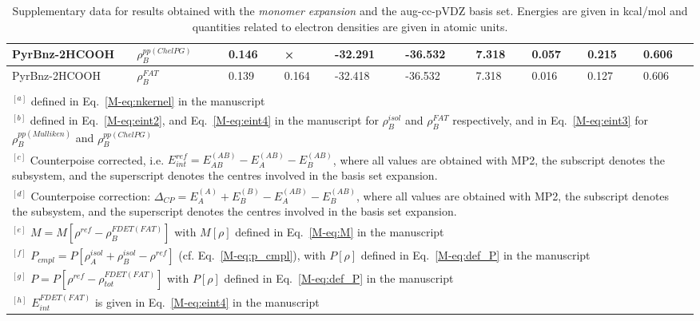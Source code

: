 \documentclass[amsmath,amssymb,preprint,aip,jcp]{revtex4-1}
\begin{document}
\begin{table}[H]
\begin{center}
{\begin{tabular}{|l|l|l|l|l|l|l|l|l|l|}
PyrBnz-2HCOOH & $\rho_B^{pp(ChelPG)}$ & 0.146 & × & -32.291 & -36.532 & 7.318 & 0.057 & 0.215 & 0.606\\\hline
PyrBnz-2HCOOH & $\rho_B^{FAT}$ & 0.139 & 0.164 & -32.418 & -36.532 & 7.318 & 0.016 & 0.127 & 0.606\\\hline
\multicolumn{10}{c}{ } \\
\multicolumn{10}{p{1.0\textwidth}}{$^{[a]}$ defined in Eq.~\ref{M-eq:nkernel} in the manuscript}\\
\multicolumn{10}{p{1.0\textwidth}}{$^{[b]}$ defined in Eq.~\ref{M-eq:eint2}, and Eq.~\ref{M-eq:eint4} in the manuscript for $\rho_B^{isol}$ and $\rho_B^{FAT }$ respectively, and in Eq.~\ref{M-eq:eint3} for $\rho_B^{pp(Mulliken)}$ and $\rho_B^{pp(ChelPG)}$}\\
\multicolumn{10}{p{1.0\textwidth}}{$^{[c]}$ Counterpoise corrected, i.e. $E_{int}^{ref} = E_{AB}^{(AB)} - E_{A}^{(AB)} - E_{B}^{(AB)}$, where all values are obtained with MP2, the subscript denotes the subsystem, and the superscript denotes the centres involved in the basis set expansion.} \\
\multicolumn{10}{p{1.0\textwidth}}{$^{[d]}$ Counterpoise correction: $\Delta_{CP} = E_{A}^{(A)} + E_{B}^{(B)} - E_{A}^{(AB)} - E_{B}^{(AB)}$, where all values are obtained with MP2, the subscript denotes the subsystem, and the superscript denotes the centres involved in the basis set expansion.} \\
\multicolumn{10}{p{1.0\textwidth}}{$^{[e]}$ $M=M[\rho^{ref} - \rho^{FDET(FAT)}_{B}]$ with $M[\rho]$ defined in Eq.~\ref{M-eq:M} in the manuscript}\\
\multicolumn{10}{p{1.0\textwidth}}{$^{[f]}$ $P_{cmpl}=P[\rho_A^{isol}+\rho_B^{isol} - \rho^{ref}]$ (cf. Eq.~\ref{M-eq:p_cmpl}), with $P[\rho]$ defined in Eq.~\ref{M-eq:def_P} in the manuscript}\\
\multicolumn{10}{p{1.0\textwidth}}{$^{[g]}$ $P=P[\rho^{ref} - \rho_{tot}^{FDET(FAT)}]$ with $P[\rho]$ defined in Eq.~\ref{M-eq:def_P} in the manuscript}\\
\multicolumn{10}{p{1.0\textwidth}}{$^{[h]}$ $E^{FDET(FAT)}_{int}$ is given in Eq.~\ref{M-eq:eint4} in the manuscript}\\
\end{tabular}
}
\end{center}
\caption{Supplementary data for results obtained with the \textit{monomer expansion} and the aug-cc-pVDZ basis set. Energies are given in kcal/mol and quantities related to electron densities are given in atomic units.}
\end{table}
\end{document}
